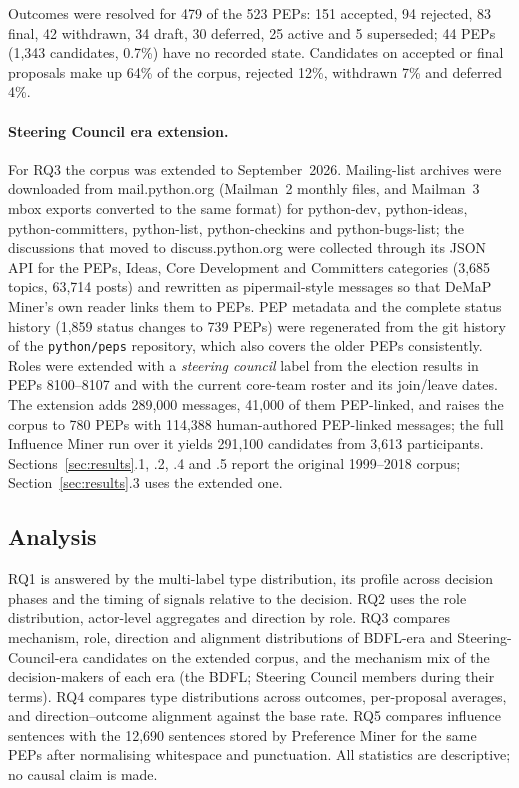 \documentclass[sigconf,screen]{acmart}
\begin{document}
Outcomes were resolved for 479 of the 523 PEPs: 151 accepted, 94 rejected, 83 final, 42 withdrawn, 34 draft, 30 deferred, 25 active and 5 superseded; 44 PEPs (1,343 candidates, 0.7\%) have no recorded state. Candidates on accepted or final proposals make up 64\% of the corpus, rejected 12\%, withdrawn 7\% and deferred 4\%.


\paragraph{Steering Council era extension.} For RQ3 the corpus was extended to September~2026. Mailing-list archives were downloaded from mail.python.org (Mailman~2 monthly files, and Mailman~3 mbox exports converted to the same format) for python-dev, python-ideas, python-committers, python-list, python-checkins and python-bugs-list; the discussions that moved to discuss.python.org were collected through its JSON API for the PEPs, Ideas, Core Development and Committers categories (3,685 topics, 63,714 posts) and rewritten as pipermail-style messages so that DeMaP Miner's own reader links them to PEPs. PEP metadata and the complete status history (1,859 status changes to 739 PEPs) were regenerated from the git history of the \texttt{python/peps} repository, which also covers the older PEPs consistently. Roles were extended with a \emph{steering council} label from the election results in PEPs 8100--8107 and with the current core-team roster and its join/leave dates. The extension adds 289,000 messages, 41,000 of them PEP-linked, and raises the corpus to 780 PEPs with 114,388 human-authored PEP-linked messages; the full Influence Miner run over it yields 291,100 candidates from 3,613 participants. Sections~\ref{sec:results}.1, .2, .4 and .5 report the original 1999--2018 corpus; Section~\ref{sec:results}.3 uses the extended one.
\subsection{Analysis}

RQ1 is answered by the multi-label type distribution, its profile across decision phases and the timing of signals relative to the decision. RQ2 uses the role distribution, actor-level aggregates and direction by role. RQ3 compares mechanism, role, direction and alignment distributions of BDFL-era and Steering-Council-era candidates on the extended corpus, and the mechanism mix of the decision-makers of each era (the BDFL; Steering Council members during their terms). RQ4 compares type distributions across outcomes, per-proposal averages, and direction--outcome alignment against the base rate. RQ5 compares influence sentences with the 12,690 sentences stored by Preference Miner for the same PEPs after normalising whitespace and punctuation. All statistics are descriptive; no causal claim is made.
\end{document}
